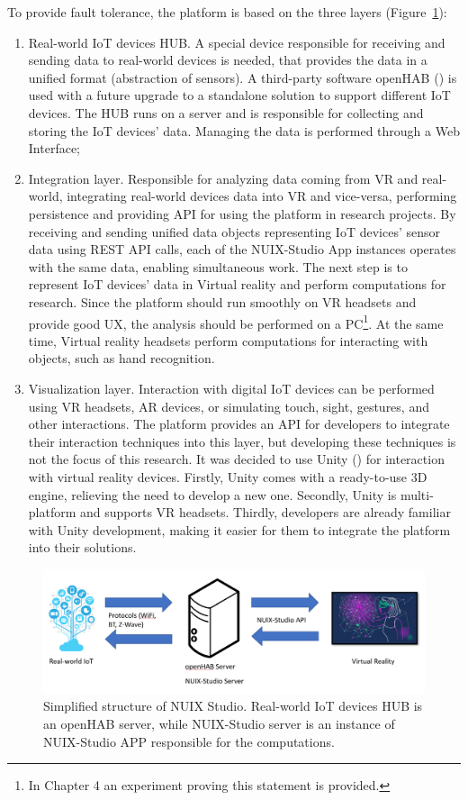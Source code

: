 To provide fault tolerance, the platform is based on the three layers (Figure~\ref{fig:BasicPlatformStructure-figure}): 
\begin{enumerate}
    \item Real-world IoT devices HUB. A special device responsible for receiving and sending data to real-world devices is needed, that provides the data in a unified format (abstraction of sensors).
    A third-party software openHAB (\cite{OpenHab}) is used with a future upgrade to a standalone solution to support different IoT devices. The HUB runs on a server and is responsible for collecting and storing the IoT devices' data. Managing the data is performed through a Web Interface;
    \item Integration layer. Responsible for analyzing data coming from VR and real-world, integrating real-world devices data into VR and vice-versa, performing persistence and providing API for using the platform in research projects. By receiving and sending unified data objects representing IoT devices' sensor data using REST API calls, each of the NUIX-Studio App instances operates with the same data, enabling simultaneous work. The next step is to represent IoT devices' data in Virtual reality and perform computations for research. Since the platform should run smoothly on VR headsets and provide good UX, the analysis should be performed on a PC\footnote{In Chapter 4 an experiment proving this statement is provided.}. At the same time, Virtual reality headsets perform computations for interacting with objects, such as hand recognition. 
    \item Visualization layer. Interaction with digital IoT devices can be performed using VR headsets, AR devices, or simulating touch, sight, gestures, and other interactions. The platform provides an API for developers to integrate their interaction techniques into this layer, but developing these techniques is not the focus of this research. It was decided to use Unity (\cite{Unity}) for interaction with virtual reality devices. Firstly, Unity comes with a ready-to-use 3D engine, relieving the need to develop a new one. Secondly, Unity is multi-platform and supports VR headsets. Thirdly, developers are already familiar with Unity development, making it easier for them to integrate the platform into their solutions.
\end{enumerate}

\begin{figure}
  \centering
  \includegraphics[width=0.9\linewidth]{figures/BasicPlatformStructure.png}
  \caption{Simplified structure of NUIX Studio. Real-world IoT devices HUB is an openHAB server, while NUIX-Studio server is an instance of NUIX-Studio APP responsible for the computations.}
  \label{fig:BasicPlatformStructure-figure}
\end{figure}

